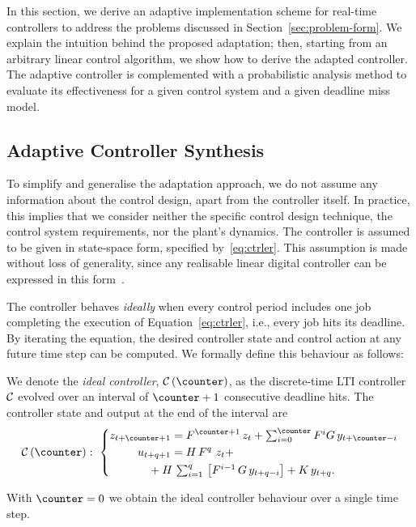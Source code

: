 In this section, we derive an adaptive implementation scheme for real-time controllers to address the problems discussed in Section~\ref{sec:problem-form}.
We explain the intuition behind the proposed adaptation; then, starting from an arbitrary linear control algorithm, we show how to derive the adapted controller.
The adaptive controller is complemented with a probabilistic analysis method to evaluate its effectiveness for a given control system and a given deadline miss model.

\subsection{Adaptive Controller Synthesis}%
\label{sec:adaptation}%
%
To simplify and generalise the adaptation approach, we do not assume any information about the control design, apart from the controller itself. 
In practice, this implies that we consider neither the specific control design technique, the control system requirements, nor the plant's dynamics.
The controller is assumed to be given in state-space form, specified by~\eqref{eq:ctrler}.
This assumption is made without loss of generality, since any realisable linear digital controller can be expressed in this form~\cite{Astrom:2008}.

The controller behaves \emph{ideally} when every control period includes one job completing the execution of Equation~\eqref{eq:ctrler}, i.e., every job hits its deadline.
By iterating the equation, the desired controller state and control action at any future time step can be computed. 
We formally define this behaviour as follows:

\begin{definition}%
    We denote the \emph{ideal controller}, $\ctrler\funof{\counter}$, as the discrete-time LTI controller $\mathcal{C}$ evolved over an interval of $\counter+1$ consecutive deadline hits.
    The controller state and output at the end of the interval are
    \begin{equation}
        \label{eq:ctrler-ideal}
        \ctrler\funof{\counter}:\,\, 
        \left\{\begin{aligned}
            z_{t+\counter+1} &= \Ac^{\counter+1}\,z_{t} + \textstyle\sum_{i=0}^{\counter} \Ac^i \Bc \,y_{t+\counter-i}\\
            u_{t+q+1} &= \Cc\, \Ac^{q}\,\,z_t + \\
            &\hspace{-2em}+ \Cc\, \textstyle\sum\nolimits_{i=1}^{q}\, \left[ \Ac^{i-1}\, \Bc\, y_{t+q-i}\right] 
            + \Dc\, y_{t+q}.
        \end{aligned}\right.
    \end{equation}
\end{definition}
With $\counter=0$ we obtain the ideal controller behaviour over a single time step.

